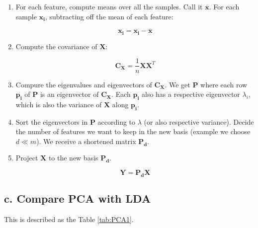 \begin{enumerate}

	\item For each feature, compute means over all the samples. Call it $\bm{\overline{x}}$. For each sample $\bm{x_i}$, subtracting off the mean of each feature: 

	\begin{equation*}	
		\bm{x_i} = \bm{x_i} - \bm{\overline{x}}
	\end{equation*}
	
	\item Compute the covariance of $\bm{X}$: 
	
	\begin{equation*}	
		\bm{C_X} = \dfrac{1}{n}\bm{XX}^T
	\end{equation*}
	
	\item Compure the eigenvalues and eigenvectors of $\bm{C_X}$. We get $\bm{P}$ where each row $\bm{p_i}$ of $\bm{P}$ is an eigenvector of $\bm{C_X}$. Each $\bm{p_i}$ also has a respective eigenvector $\lambda_i$, which is also the variance of $\bm{X}$ along $\bm{p_i}$.
	
	\item Sort the eigenvectors in $\bm{P}$ according to $\lambda$ (or also respective variance). Decide the number of features we want to keep in the new basis (example we choose $d \ll m$). We receive  a shortened matrix $\bm{P_d}$.
	
	\item Project $\bm{X}$ to the new basis $\bm{P_d}$. 
	
	\begin{equation*}
		\bm{Y} = \bm{P_dX}
	\end{equation*}

\end{enumerate}

\subsection*{c. Compare PCA with LDA}

This is described as the Table \ref{tab:PCA1}.

